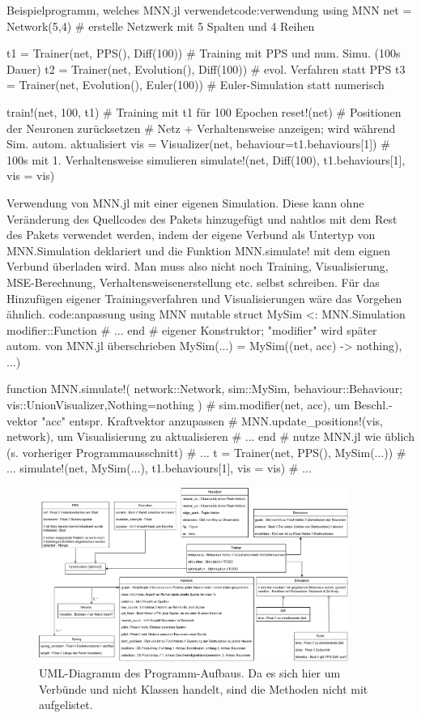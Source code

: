 \documentclass[10pt]{scrartcl}
\begin{document}
\begin{code}[1]{Beispielprogramm, welches MNN.jl verwendet}{code:verwendung}
using MNN
net = Network(5,4) # erstelle Netzwerk mit 5 Spalten und 4 Reihen

t1 = Trainer(net, PPS(), Diff(100)) # Training mit PPS und num. Simu. (100s Dauer)
t2 = Trainer(net, Evolution(), Diff(100)) # evol. Verfahren statt PPS
t3 = Trainer(net, Evolution(), Euler(100)) # Euler-Simulation statt numerisch

train!(net, 100, t1) # Training mit t1 für 100 Epochen
reset!(net) # Positionen der Neuronen zurücksetzen
# Netz + Verhaltensweise anzeigen; wird während Sim. autom. aktualisiert
vis = Visualizer(net, behaviour=t1.behaviours[1])
# 100s mit 1. Verhaltensweise simulieren
simulate!(net, Diff(100), t1.behaviours[1], vis = vis)
\end{code}

\begin{code}[1]{Verwendung von MNN.jl mit einer eigenen Simulation.
Diese kann ohne Veränderung des Quellcodes des Pakets hinzugefügt und nahtlos mit dem Rest des Pakets verwendet werden, indem der eigene Verbund als Untertyp von MNN.Simulation deklariert und die Funktion MNN.simulate! mit dem eignen Verbund überladen wird. 
Man muss also nicht noch Training, Visualisierung, MSE-Berechnung, Verhaltensweisenerstellung etc. selbst schreiben. Für das Hinzufügen eigener Trainingsverfahren und Visualisierungen wäre das Vorgehen ähnlich.
}{code:anpassung}
using MNN
mutable struct MySim <: MNN.Simulation
    modifier::Function
    # ...
end
# eigener Konstruktor; "modifier" wird später autom. von MNN.jl überschrieben
MySim(...) = MySim((net, acc) -> nothing), ...)

function MNN.simulate!(
    network::Network, sim::MySim, behaviour::Behaviour; 
    vis::Union{Visualizer,Nothing}=nothing
)
    # sim.modifier(net, acc), um Beschl.-vektor "acc" entspr. Kraftvektor anzupassen
    # MNN.update_positions!(vis, network), um Visualisierung zu aktualisieren
    # ...
end
# nutze MNN.jl wie üblich (s. vorheriger Programmausschnitt)
# ...
t = Trainer(net, PPS(), MySim(...))
# ...
simulate!(net, MySim(...), t1.behaviours[1], vis = vis)
# ...
\end{code}


\begin{figure}[H]
    \centering
    \includegraphics[width=0.9\textwidth]{bilder/UML.pdf}
    \caption{UML-Diagramm des Programm-Aufbaus. Da es sich hier um Verbünde und nicht Klassen handelt, sind die Methoden nicht mit aufgelistet.}
    \label{fig:uml}
\end{figure}
\end{document}
